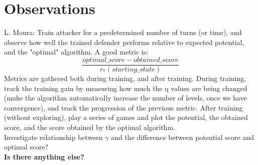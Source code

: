 \documentclass{article}
\theoremstyle{plain}
\theoremstyle{definition}
\theoremstyle{remark}
\begin{document}
\newpage
\section{Observations}
L. Moura: Train attacker for a predetermined number of turns (or time), and observe how well the trained defender performs relative to expected potential, and the "optimal" algorithm. A good metric is:
\begin{equation*}
\frac{optimal\_score - obtained\_score}{r_{*}(starting\_state)}
\end{equation*}
Metrics are gathered both during training, and after training. During training, track the training gain by measuring how much the q values are being changed (make the algorithm automatically increase the number of levels, once we have convergence), and track the progression of the previous metric. After training (without exploring), play a series of games and plot the potential, the obtained score, and the score obtained by the optimal algorithm. \\

Investigate relationship between $\gamma$ and the difference between potential score and optimal score? \\

\textbf{Is there anything else?}

%
\end{document}
